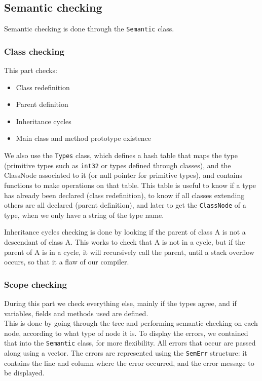 \documentclass[a4paper,11pt]{article}
\begin{document}
\subsection{Semantic checking}
  \label{sec:semantic}
  Semantic checking is done through the \texttt{Semantic} class.\\

  \subsubsection{Class checking}
  	This part checks:
    \begin{itemize}
    \item Class redefinition
    \item Parent definition
    \item Inheritance cycles
    \item Main class and method prototype existence
    \end{itemize}
  We also use the \texttt{Types} class, which defines a hash table that maps the type (primitive types such as \texttt{int32} or types defined through classes), and the ClassNode associated to it (or null pointer for primitive types), and contains functions to make operations on that table.
	This table is useful to know if a type has already been declared (class redefinition), to know if all classes extending others are all declared (parent definition), and later to get the \texttt{ClassNode} of a type, when we only have a string of the type name.

	Inheritance cycles checking is done by looking if the parent of class A is not a descendant of class A. This works to check that A is not in a cycle, but if the parent of A is in a cycle, it will recursively call the parent, until a stack overflow occurs, so that it a flaw of our compiler.

	\subsubsection{Scope checking}
	During this part we check everything else, mainly if the types agree, and if variables, fields and methods used are defined.\\
	This is done by going through the tree and performing semantic checking on each node, according to what type of node it is. To display the errors, we contained that into the \texttt{Semantic} class, for more flexibility. All errors that occur are passed along using a vector. The errors are represented using the \texttt{SemErr} structure: it contains the line and column where the error occurred, and the error message to be displayed.
      
\end{document}
